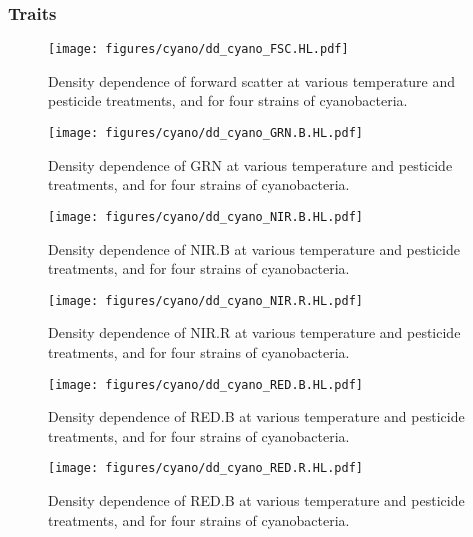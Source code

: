 \clearpage

\subsubsection{Traits}

\begin{figure}[hbt!]
    \centering
    \texttt{[image: figures/cyano/dd\_cyano\_FSC.HL.pdf]}
    \caption{Density dependence of forward scatter at various temperature and pesticide treatments, and for four strains of cyanobacteria.}
    \label{fig:dd_cyano_FSC.HL}
\end{figure}

\begin{figure}[hbt!]
    \centering
    \texttt{[image: figures/cyano/dd\_cyano\_GRN.B.HL.pdf]}
    \caption{Density dependence of GRN at various temperature and pesticide treatments, and for four strains of cyanobacteria.}
    \label{fig:dd_cyano_GRN.B.HL}
\end{figure}

\begin{figure}[hbt!]
    \centering
    \texttt{[image: figures/cyano/dd\_cyano\_NIR.B.HL.pdf]}
    \caption{Density dependence of NIR.B at various temperature and pesticide treatments, and for four strains of cyanobacteria.}
    \label{fig:dd_cyano_NIR.B.HL}
\end{figure}

\begin{figure}[hbt!]
    \centering
    \texttt{[image: figures/cyano/dd\_cyano\_NIR.R.HL.pdf]}
    \caption{Density dependence of NIR.R at various temperature and pesticide treatments, and for four strains of cyanobacteria.}
    \label{fig:dd_cyano_NIR.R.HL}
\end{figure}

\begin{figure}[hbt!]
    \centering
    \texttt{[image: figures/cyano/dd\_cyano\_RED.B.HL.pdf]}
    \caption{Density dependence of RED.B at various temperature and pesticide treatments, and for four strains of cyanobacteria.}
    \label{fig:dd_cyano_RED.B.HL}
\end{figure}

\begin{figure}[hbt!]
    \centering
    \texttt{[image: figures/cyano/dd\_cyano\_RED.R.HL.pdf]}
    \caption{Density dependence of RED.B at various temperature and pesticide treatments, and for four strains of cyanobacteria.}
    \label{fig:dd_cyano_RED.R.HL}
\end{figure}

